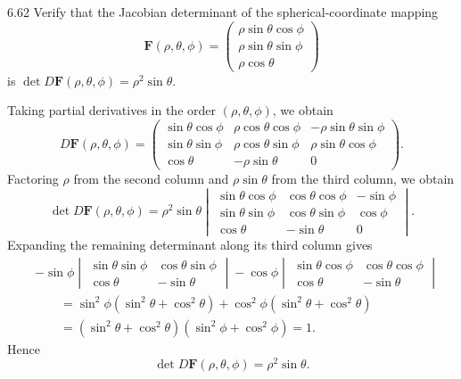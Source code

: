 \documentclass[11pt,oneside]{article}
\begin{document}
\begin{problem}{6.62}
Verify that the Jacobian determinant of the spherical-coordinate mapping
\[
    \mathbf F(\rho, \theta, \phi)=
    \begin{pmatrix}
        \rho\sin\theta\cos\phi\\
        \rho\sin\theta\sin\phi\\
        \rho\cos\theta
    \end{pmatrix}
\]
is $\det D\mathbf F(\rho, \theta, \phi)=\rho^2\sin\theta$.
\end{problem}
\begin{solution}
Taking partial derivatives in the order $(\rho, \theta, \phi)$,
we obtain
\[
    D\mathbf F(\rho, \theta, \phi)=
    \begin{pmatrix}
        \sin\theta\cos\phi & \rho\cos\theta\cos\phi
            & -\rho\sin\theta\sin\phi\\
        \sin\theta\sin\phi & \rho\cos\theta\sin\phi
            & \rho\sin\theta\cos\phi\\
        \cos\theta & -\rho\sin\theta & 0
    \end{pmatrix}.
\]
Factoring $\rho$ from the second column and $\rho\sin\theta$ from
the third column, we obtain
\[
    \det D\mathbf F(\rho, \theta, \phi)
    =\rho^2\sin\theta
    \begin{vmatrix}
        \sin\theta\cos\phi & \cos\theta\cos\phi & -\sin\phi\\
        \sin\theta\sin\phi & \cos\theta\sin\phi & \cos\phi\\
        \cos\theta & -\sin\theta & 0
    \end{vmatrix}.
\]
Expanding the remaining determinant along its third column gives
\[
\begin{aligned}
    &-\sin\phi
      \begin{vmatrix}
        \sin\theta\sin\phi & \cos\theta\sin\phi\\
        \cos\theta & -\sin\theta
      \end{vmatrix}
      -\cos\phi
      \begin{vmatrix}
        \sin\theta\cos\phi & \cos\theta\cos\phi\\
        \cos\theta & -\sin\theta
      \end{vmatrix}\\
    &\qquad=\sin^2\phi(\sin^2\theta+\cos^2\theta)
      +\cos^2\phi(\sin^2\theta+\cos^2\theta)\\
    &\qquad=(\sin^2\theta+\cos^2\theta)(\sin^2\phi+\cos^2\phi)=1.
\end{aligned}
\]
Hence
\[
    \det D\mathbf F(\rho, \theta, \phi)
    =\boxed{\rho^2\sin\theta}.
\]
\end{solution}
\end{document}
